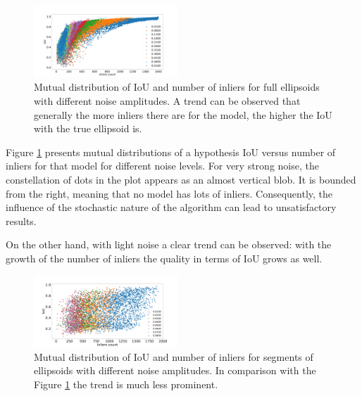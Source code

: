 \begin{figure}[!htb]
  \centering
      \includegraphics[width=0.48\textwidth]{images/iou_inlier_normal_noise.png}
      \caption{Mutual distribution of IoU and number of inliers for full ellipsoids with different noise amplitudes. A trend can be observed that generally the more inliers there are for the model, the higher the IoU with the true ellipsoid is.}
      \label{fig:iou_inlier_normal_noise}
\end{figure}

Figure \ref{fig:iou_inlier_normal_noise} presents mutual distributions of a hypothesis IoU versus number of inliers for that model for different noise levels.
For very strong noise, the constellation of dots in the plot appears as an almost vertical blob.
It is bounded from the right, meaning that no model has lots of inliers.
Consequently, the influence of the stochastic nature of the algorithm can lead to unsatisfactory results.

On the other hand, with light noise a clear trend can be observed: with the growth of the number of inliers the quality in terms of IoU grows as well.

\begin{figure}[!htb]
  \centering
      \includegraphics[width=0.48\textwidth]{images/iou_inlier_segment_normal_noise.png}
      \caption{Mutual distribution of IoU and number of inliers for segments of ellipsoids with different noise amplitudes. In comparison with the Figure \ref{fig:iou_inlier_normal_noise} the trend is much less prominent.}
      \label{fig:iou_inlier_segment_normal_noise}
\end{figure}

